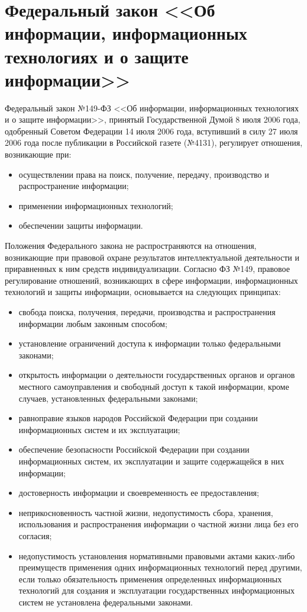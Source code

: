 \section{Федеральный закон <<Об информации, информационных технологиях и о защите информации>>} \label{rights_149}

Федеральный закон №149-ФЗ <<Об информации, информационных технологиях и о защите информации>>, принятый Государственной Думой 8 июля 2006 года, одобренный Советом Федерации 14 июля 2006 года, вступивший в силу 27 июля 2006 года после публикации в Российской газете (№4131), регулирует отношения, возникающие при:
\begin{itemize}
	\item осуществлении права на поиск, получение, передачу, производство и распространение информации;
	\item применении информационных технологий;
	\item обеспечении защиты информации.
\end{itemize}

Положения Федерального закона не распространяются на отношения, возникающие при правовой охране результатов интеллектуальной деятельности и приравненных к ним средств индивидуализации.
\vspace{\baselineskip}
Согласно ФЗ №149, правовое регулирование отношений, возникающих в сфере информации, информационных технологий и защиты информации, основывается на следующих принципах:
\begin{itemize}
	\item свобода поиска, получения, передачи, производства и распространения информации любым законным способом;
	\item установление ограничений доступа к информации только федеральными законами;
	\item открытость информации о деятельности государственных органов и органов местного самоуправления и свободный доступ к такой информации, кроме случаев, установленных федеральными законами;
	\item равноправие языков народов Российской Федерации при создании информационных систем и их эксплуатации;
	\item обеспечение безопасности Российской Федерации при создании информационных систем, их эксплуатации и защите содержащейся в них информации;
	\item достоверность информации и своевременность ее предоставления;
	\item неприкосновенность частной жизни, недопустимость сбора, хранения, использования и распространения информации о частной жизни лица без его согласия;
	\item недопустимость установления нормативными правовыми актами каких-либо преимуществ применения одних информационных технологий перед другими, если только обязательность применения определенных информационных технологий для создания и эксплуатации государственных информационных систем не установлена федеральными законами.
\end{itemize}

